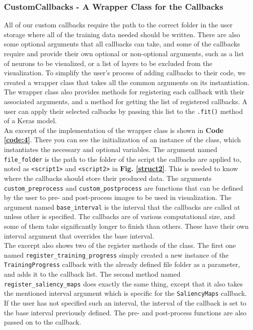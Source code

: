 \subsubsection{CustomCallbacks - A Wrapper Class for the Callbacks}

All of our custom callbacks require the path to the correct folder in the user storage where all of the training data needed should be written. There are also some optional arguments that all callbacks can take, and some of the callbacks require and provide their own optional or non-optional arguments, such as a list of neurons to be visualized, or a list of layers to be excluded from the visualization. To simplify the user's process of adding callbacks to their code, we created a wrapper class that takes all the common arguments on its instantiation. The wrapper class also provides methods for registering each callback with their associated arguments, and a method for getting the list of registered callbacks. A user can apply their selected calbacks by passing this list to the \texttt{.fit()} method of a Keras model.\\

\noindent An excerpt of the implementation of the wrapper class is shown in \textbf{Code \ref{code:4}}. There you can see the initialization of an instance of the class, which instantiates the necessary and optional variables. The argument named \texttt{file\_folder} is the path to the folder of the script the callbacks are applied to, noted as \texttt{<script1>} and \texttt{<script2>} in \textbf{Fig. \ref{struct2}}. This is needed to know where the callbacks should store their produced data. The arguments \texttt{custom\_preprocess} and \texttt{custom\_postprocess} are functions that can be defined by the user to pre- and post-process images to be used in visualization. The argument named \texttt{base\_interval} is the interval that the callbacks are called at unless other is specified. The callbacks are of various computational size, and some of them take significantly longer to finish than others. These have their own interval argument that overrides the base interval.\\

\noindent The excerpt also shows two of the register methods of the class. The first one named \texttt{register\_training\_progress} simply created a new instance of the \texttt{Training\-Progress} callback with the already defined file folder as a parameter, and adds it to the callback list. The second method named \texttt{register\_saliency\_maps} does exactly the same thing, except that it also takes the mentioned interval argument which is specific for the \texttt{SaliencyMaps} callback. If the user has not specified such an interval, the interval of the callback is set to the base interval previously defined. The pre- and post-process functions are also passed on to the callback.

